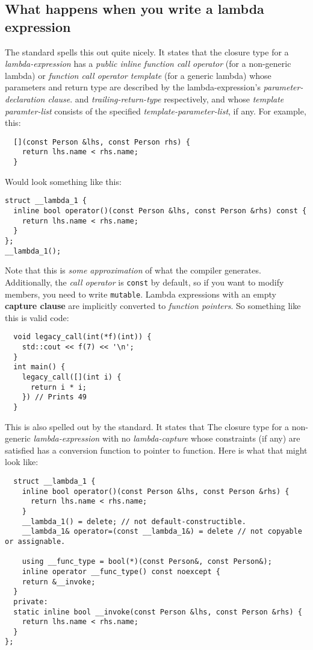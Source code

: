\documentclass{report}
\begin{document}
\subsection{What happens when you write a lambda expression}
The standard spells this out quite nicely. It states that the closure type for a \textit{lambda-expression} has a \textit{public inline function call operator} (for a non-generic lambda) or \textit{function call operator template} (for a generic lambda) whose parameters and return type are described by the lambda-expression's \textit{parameter-declaration clause}. and \textit{trailing-return-type} respectively, and whose \textit{template paramter-list} consists of the specified \textit{template-parameter-list}, if any.
\bigbreak \noindent
For example, this:
\begin{verbatim}
  [](const Person &lhs, const Person rhs) {
    return lhs.name < rhs.name;
  }
\end{verbatim}
Would look something like this:
\begin{verbatim}
struct __lambda_1 {
  inline bool operator()(const Person &lhs, const Person &rhs) const {
    return lhs.name < rhs.name;
  }
};
__lambda_1();
\end{verbatim}
Note that this is \textit{some approximation} of what the compiler generates. Additionally, the \textit{call operator} is \texttt{const} by default, so if you want to modify members, you need to write \texttt{mutable}.
\bigbreak \noindent
Lambda expressions with an empty \textbf{capture clause} are implicitly converted to \textit{function pointers}. So something like this is valid code:
\begin{verbatim}
  void legacy_call(int(*f)(int)) {
    std::cout << f(7) << '\n';
  }
  int main() {
    legacy_call([](int i) {
      return i * i;
    }) // Prints 49
  } 
\end{verbatim}
This is also spelled out by the standard. It states that The closure type for a non-generic \textit{lambda-expression} with no \textit{lambda-capture} whose constraints (if any) are satisfied has a conversion function to pointer to function. Here is what that might look like:
\begin{verbatim}
  struct __lambda_1 {
    inline bool operator()(const Person &lhs, const Person &rhs) {
      return lhs.name < rhs.name;
    }
    __lambda_1() = delete; // not default-constructible.
    __lambda_1& operator=(const __lambda_1&) = delete // not copyable or assignable.

    using __func_type = bool(*)(const Person&, const Person&);
    inline operator __func_type() const noexcept {
    return &__invoke;
  }
  private: 
  static inline bool __invoke(const Person &lhs, const Person &rhs) {
    return lhs.name < rhs.name;
  }
};
\end{verbatim}
\end{document}
